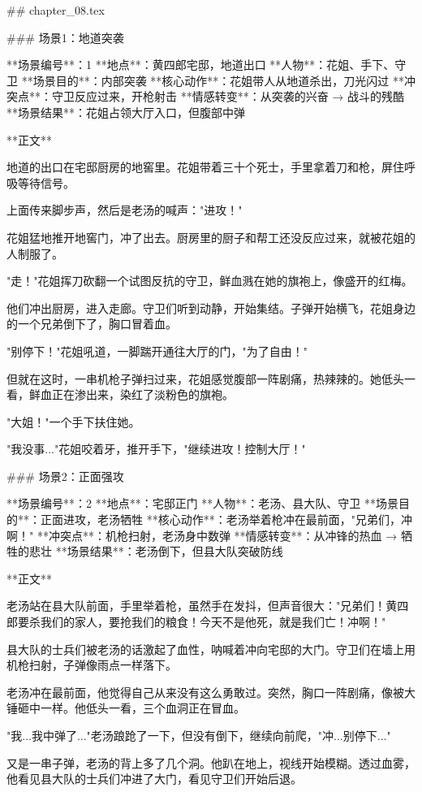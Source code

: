 ## chapter_08.tex

### 场景1：地道突袭

**场景编号**：1  
**地点**：黄四郎宅邸，地道出口  
**人物**：花姐、手下、守卫  
**场景目的**：内部突袭  
**核心动作**：花姐带人从地道杀出，刀光闪过  
**冲突点**：守卫反应过来，开枪射击  
**情感转变**：从突袭的兴奋 → 战斗的残酷  
**场景结果**：花姐占领大厅入口，但腹部中弹

**正文**

地道的出口在宅邸厨房的地窖里。花姐带着三十个死士，手里拿着刀和枪，屏住呼吸等待信号。

上面传来脚步声，然后是老汤的喊声："进攻！"

花姐猛地推开地窖门，冲了出去。厨房里的厨子和帮工还没反应过来，就被花姐的人制服了。

"走！"花姐挥刀砍翻一个试图反抗的守卫，鲜血溅在她的旗袍上，像盛开的红梅。

他们冲出厨房，进入走廊。守卫们听到动静，开始集结。子弹开始横飞，花姐身边的一个兄弟倒下了，胸口冒着血。

"别停下！"花姐吼道，一脚踹开通往大厅的门，"为了自由！"

但就在这时，一串机枪子弹扫过来，花姐感觉腹部一阵剧痛，热辣辣的。她低头一看，鲜血正在渗出来，染红了淡粉色的旗袍。

"大姐！"一个手下扶住她。

"我没事..."花姐咬着牙，推开手下，"继续进攻！控制大厅！"

### 场景2：正面强攻

**场景编号**：2  
**地点**：宅邸正门  
**人物**：老汤、县大队、守卫  
**场景目的**：正面进攻，老汤牺牲  
**核心动作**：老汤举着枪冲在最前面，"兄弟们，冲啊！"  
**冲突点**：机枪扫射，老汤身中数弹  
**情感转变**：从冲锋的热血 → 牺牲的悲壮  
**场景结果**：老汤倒下，但县大队突破防线

**正文**

老汤站在县大队前面，手里举着枪，虽然手在发抖，但声音很大："兄弟们！黄四郎要杀我们的家人，要抢我们的粮食！今天不是他死，就是我们亡！冲啊！"

县大队的士兵们被老汤的话激起了血性，呐喊着冲向宅邸的大门。守卫们在墙上用机枪扫射，子弹像雨点一样落下。

老汤冲在最前面，他觉得自己从来没有这么勇敢过。突然，胸口一阵剧痛，像被大锤砸中一样。他低头一看，三个血洞正在冒血。

"我...我中弹了..."老汤踉跄了一下，但没有倒下，继续向前爬，"冲...别停下..."

又是一串子弹，老汤的背上多了几个洞。他趴在地上，视线开始模糊。透过血雾，他看见县大队的士兵们冲进了大门，看见守卫们开始后退。

